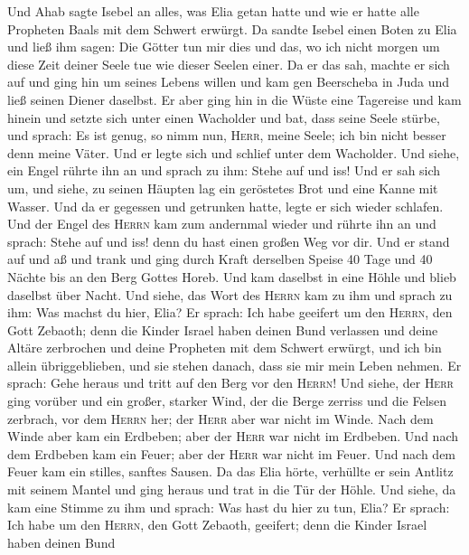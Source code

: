  Und Ahab sagte Isebel an alles, was Elia getan hatte und
wie er hatte alle Propheten Baals mit dem Schwert erwürgt.
 Da sandte Isebel einen Boten zu Elia und ließ ihm sagen:
Die Götter tun mir dies und das, wo ich nicht morgen um diese Zeit
deiner Seele tue wie dieser Seelen einer.  Da er das sah,
machte er sich auf und ging hin um seines Lebens willen und kam gen
Beerscheba in Juda und ließ seinen Diener daselbst.  Er
aber ging hin in die Wüste eine Tagereise und kam hinein und setzte sich
unter einen Wacholder und bat, dass seine Seele stürbe, und sprach: Es
ist genug, so nimm nun, \textsc{Herr}, meine Seele; ich bin nicht besser
denn meine Väter.  Und er legte sich und schlief unter dem
Wacholder. Und siehe, ein Engel rührte ihn an und sprach zu ihm: Stehe
auf und iss!  Und er sah sich um, und siehe, zu seinen
Häupten lag ein geröstetes Brot und eine Kanne mit Wasser. Und da er
gegessen und getrunken hatte, legte er sich wieder schlafen.
 Und der Engel des \textsc{Herrn} kam zum andernmal wieder
und rührte ihn an und sprach: Stehe auf und iss! denn du hast einen
großen Weg vor dir.  Und er stand auf und aß und trank und
ging durch Kraft derselben Speise 40 Tage und 40 Nächte bis an den Berg
Gottes Horeb.  Und kam daselbst in eine Höhle und blieb
daselbst über Nacht. Und siehe, das Wort des \textsc{Herrn} kam zu ihm
und sprach zu ihm: Was machst du hier, Elia?  Er sprach:
Ich habe geeifert um den \textsc{Herrn}, den Gott Zebaoth; denn die
Kinder Israel haben deinen Bund verlassen und deine Altäre zerbrochen
und deine Propheten mit dem Schwert erwürgt, und ich bin allein
übriggeblieben, und sie stehen danach, dass sie mir mein Leben nehmen.
 Er sprach: Gehe heraus und tritt auf den Berg vor den
\textsc{Herrn}! Und siehe, der \textsc{Herr} ging vorüber und ein
großer, starker Wind, der die Berge zerriss und die Felsen zerbrach, vor
dem \textsc{Herrn} her; der \textsc{Herr} aber war nicht im Winde. Nach
dem Winde aber kam ein Erdbeben; aber der \textsc{Herr} war nicht im
Erdbeben.  Und nach dem Erdbeben kam ein Feuer; aber der
\textsc{Herr} war nicht im Feuer. Und nach dem Feuer kam ein stilles,
sanftes Sausen.  Da das Elia hörte, verhüllte er sein
Antlitz mit seinem Mantel und ging heraus und trat in die Tür der Höhle.
Und siehe, da kam eine Stimme zu ihm und sprach: Was hast du hier zu
tun, Elia?  Er sprach: Ich habe um den \textsc{Herrn},
den Gott Zebaoth, geeifert; denn die Kinder Israel haben deinen Bund
